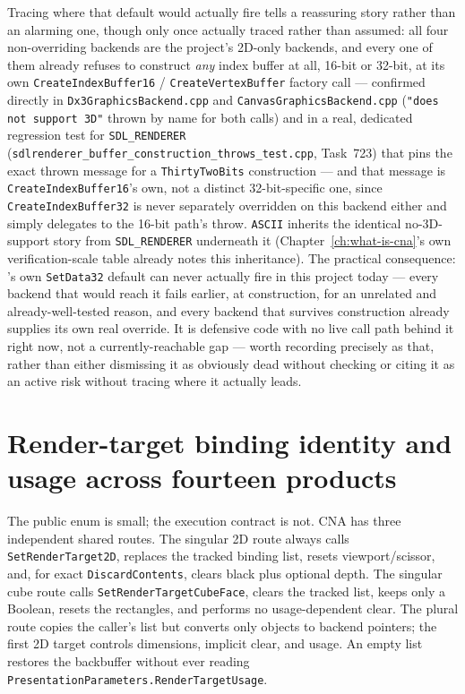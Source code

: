 Tracing where that default would actually fire tells a reassuring story rather than an
alarming one, though only once actually traced rather than assumed: all four non-overriding
backends are the project's 2D-only backends, and every one of them already refuses to
construct \emph{any} index buffer at all, 16-bit or 32-bit, at its own
\texttt{CreateIndexBuffer16} / \texttt{CreateVertexBuffer} factory call --- confirmed directly
in \texttt{Dx3GraphicsBackend.cpp} and \texttt{CanvasGraphicsBackend.cpp} (\texttt{"does not
support 3D"} thrown by name for both calls) and in a real, dedicated regression test for
\texttt{SDL\_RENDERER} (\texttt{sdlrenderer\_buffer\_construction\_throws\_test.cpp}, Task~723)
that pins the exact thrown message for a \texttt{ThirtyTwoBits} 
construction --- and that message is \texttt{CreateIndexBuffer16}'s own, not a distinct
32-bit-specific one, since \texttt{CreateIndexBuffer32} is never separately overridden on this
backend either and simply delegates to the 16-bit path's throw. \texttt{ASCII} inherits the
identical no-3D-support story from \texttt{SDL\_RENDERER} underneath it
(Chapter~\ref{ch:what-is-cna}'s own verification-scale table already notes this inheritance).
The practical consequence: 's own \texttt{SetData32} default can
never actually fire in this project today --- every backend that would reach it fails earlier,
at construction, for an unrelated and already-well-tested reason, and every backend that
survives construction already supplies its own real override. It is defensive code with no
live call path behind it right now, not a currently-reachable gap --- worth recording precisely
as that, rather than either dismissing it as obviously dead without checking or citing it as an
active risk without tracing where it actually leads.

\section{Render-target binding identity and usage across fourteen products}
\label{sec:backend-rendertarget-usage-matrix}

The public enum is small; the execution contract is not. CNA has three independent shared
routes. The singular 2D route always calls \texttt{SetRenderTarget2D}, replaces the tracked
binding list, resets viewport/scissor, and, for exact
\texttt{DiscardContents}, clears black plus optional depth. The singular cube route calls
\texttt{SetRenderTargetCubeFace}, clears the tracked list, keeps only a Boolean, resets the
rectangles, and performs no usage-dependent clear. The plural route copies the caller's list
but converts only  objects to backend pointers; the first 2D target
controls dimensions, implicit clear, and usage. An empty list restores the backbuffer without
ever reading \texttt{PresentationParameters.RenderTargetUsage}.

